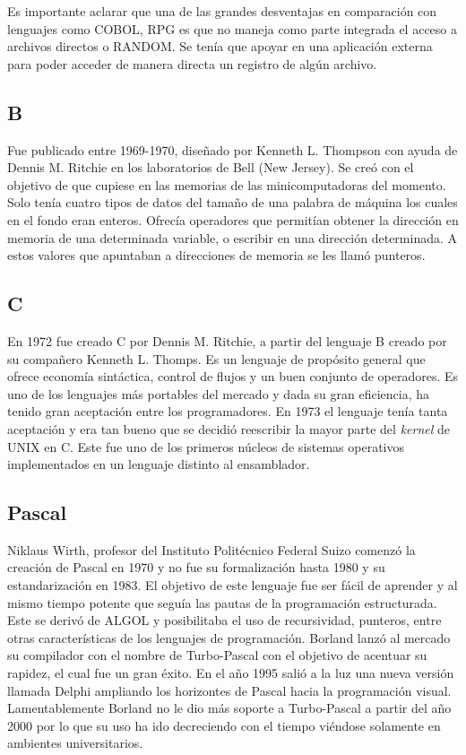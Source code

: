 \documentclass[twoside,twocolumn]{article}
\begin{document}
Es importante aclarar que una de las grandes desventajas en comparación con lenguajes como COBOL, RPG es que no maneja como parte integrada el acceso a archivos directos o RANDOM. Se tenía que apoyar en una aplicación externa para poder acceder de manera directa un registro de algún archivo.

\subsection{B}
Fue publicado entre 1969-1970, diseñado por Kenneth L. Thompson con ayuda de Dennis M. Ritchie en los laboratorios de Bell (New Jersey). Se creó con el objetivo de que cupiese en las memorias de las minicomputadoras del momento. Solo tenía cuatro tipos de datos del tamaño de una palabra de máquina los cuales en el fondo eran enteros. Ofrecía operadores que permitían obtener la dirección en memoria de una determinada variable, o escribir en una dirección determinada. A estos valores que apuntaban a direcciones de memoria se les llamó punteros.

\subsection{C}
En 1972 fue creado C por Dennis M. Ritchie, a partir del lenguaje B creado por su compañero Kenneth L. Thomps. Es un lenguaje de propósito general que ofrece economía sintáctica, control de flujos y un buen conjunto de operadores. Es uno de los lenguajes más portables del mercado y dada su gran eficiencia, ha tenido gran aceptación entre los programadores. En 1973 el lenguaje tenía tanta aceptación y era tan bueno que se decidió reescribir la mayor parte del \textit{kernel} de UNIX en C. Este fue uno de los primeros núcleos de sistemas operativos implementados en un lenguaje distinto al ensamblador.

\subsection{Pascal}

Niklaus Wirth, profesor del Instituto Politécnico Federal Suizo comenzó la creación de Pascal en 1970 y no fue su formalización hasta 1980 y su estandarización en 1983. El objetivo de este lenguaje fue ser fácil de aprender y al mismo tiempo potente que seguía las pautas de la programación estructurada. Este se derivó de ALGOL y posibilitaba el uso de recursividad, punteros, entre otras características de los lenguajes de programación. Borland lanzó al mercado su compilador con el nombre de Turbo-Pascal con el objetivo de acentuar su rapidez, el cual fue un gran éxito. En el año 1995 salió a la luz una nueva versión llamada Delphi ampliando los horizontes de Pascal hacia la programación visual. Lamentablemente Borland no le dio más soporte a Turbo-Pascal a partir del año 2000 por lo que su uso ha ido decreciendo con el tiempo viéndose solamente en ambientes universitarios.
\end{document}
